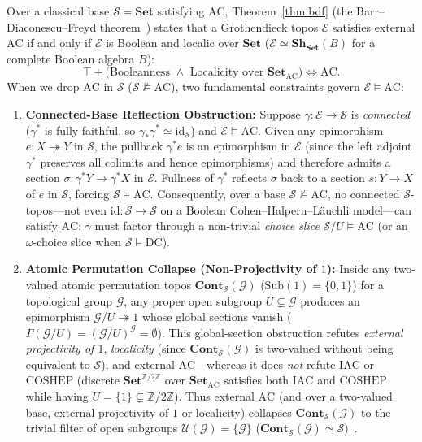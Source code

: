 Over a classical base $\mathcal{S} = \mathbf{Set}$ satisfying $\mathrm{AC}$, Theorem~\ref{thm:bdf} (the Barr--Diaconescu--Freyd theorem~\cite{Barr74,Diaconescu75,Freyd72}) states that a Grothendieck topos $\mathcal{E}$ satisfies external $\mathrm{AC}$ if and only if $\mathcal{E}$ is Boolean and localic over $\mathbf{Set}$ ($\mathcal{E} \simeq \mathbf{Sh}_{\mathbf{Set}}(B)$ for a complete Boolean algebra $B$):
\[
  \top + \bigl(\text{Booleanness } \wedge \text{ Localicity over } \mathbf{Set}_{\mathrm{AC}}\bigr) \iff \mathrm{AC}.
\]
When we drop $\mathrm{AC}$ in $\mathcal{S}$ ($\mathcal{S} \not\models \mathrm{AC}$), two fundamental constraints govern $\mathcal{E} \models \mathrm{AC}$:
\begin{enumerate}
  \item \textbf{Connected-Base Reflection Obstruction:} Suppose $\gamma : \mathcal{E} \to \mathcal{S}$ is \emph{connected} ($\gamma^*$ is fully faithful, so $\gamma_* \gamma^* \simeq \mathrm{id}_{\mathcal{S}}$) and $\mathcal{E} \models \mathrm{AC}$. Given any epimorphism $e : X \twoheadrightarrow Y$ in $\mathcal{S}$, the pullback $\gamma^* e$ is an epimorphism in $\mathcal{E}$ (since the left adjoint $\gamma^*$ preserves all colimits and hence epimorphisms) and therefore admits a section $\sigma : \gamma^* Y \to \gamma^* X$ in $\mathcal{E}$. Fullness of $\gamma^*$ reflects $\sigma$ back to a section $s : Y \to X$ of $e$ in $\mathcal{S}$, forcing $\mathcal{S} \models \mathrm{AC}$. Consequently, over a base $\mathcal{S} \not\models \mathrm{AC}$, no connected $\mathcal{S}$-topos---not even $\mathrm{id} : \mathcal{S} \to \mathcal{S}$ on a Boolean Cohen--Halpern--Läuchli model---can satisfy $\mathrm{AC}$; $\gamma$ must factor through a non-trivial \emph{choice slice} $\mathcal{S}/U \models \mathrm{AC}$ (or an $\omega$-choice slice when $\mathcal{S} \models \mathrm{DC}$).
  \item \textbf{Atomic Permutation Collapse (Non-Projectivity of $1$):} Inside any two-valued atomic permutation topos $\mathbf{Cont}_{\mathcal{S}}(\mathcal{G})$ ($\mathrm{Sub}(1) = \{0,1\}$) for a topological group $\mathcal{G}$, any proper open subgroup $U \subsetneq \mathcal{G}$ produces an epimorphism $\mathcal{G}/U \twoheadrightarrow 1$ whose global sections vanish ($\Gamma(\mathcal{G}/U) = (\mathcal{G}/U)^{\mathcal{G}} = \emptyset$). This global-section obstruction refutes \emph{external projectivity of $1$}, \emph{localicity} (since $\mathbf{Cont}_{\mathcal{S}}(\mathcal{G})$ is two-valued without being equivalent to $\mathcal{S}$), and external $\mathrm{AC}$---whereas it does \emph{not} refute $\mathrm{IAC}$ or $\mathrm{COSHEP}$ (discrete $\mathbf{Set}^{\mathbb{Z}/2\mathbb{Z}}$ over $\mathbf{Set}_{\mathrm{AC}}$ satisfies both $\mathrm{IAC}$ and $\mathrm{COSHEP}$ while having $U = \{1\} \subsetneq \mathbb{Z}/2\mathbb{Z}$). Thus external $\mathrm{AC}$ (and over a two-valued base, external projectivity of $1$ or localicity) collapses $\mathbf{Cont}_{\mathcal{S}}(\mathcal{G})$ to the trivial filter of open subgroups $\mathcal{U}(\mathcal{G}) = \{\mathcal{G}\}$ ($\mathbf{Cont}_{\mathcal{S}}(\mathcal{G}) \simeq \mathcal{S}$)~\cite{Johnstone02,Kihara26}.
\end{enumerate}

